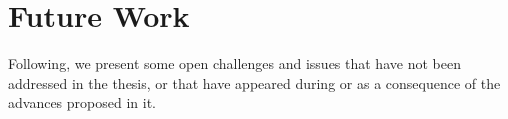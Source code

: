


\section{Future Work}
\label{sec:chp7_future-work}


Following, we present some open challenges and issues that have not been addressed in the thesis, or that have appeared during or as a consequence of the advances proposed in it. 





